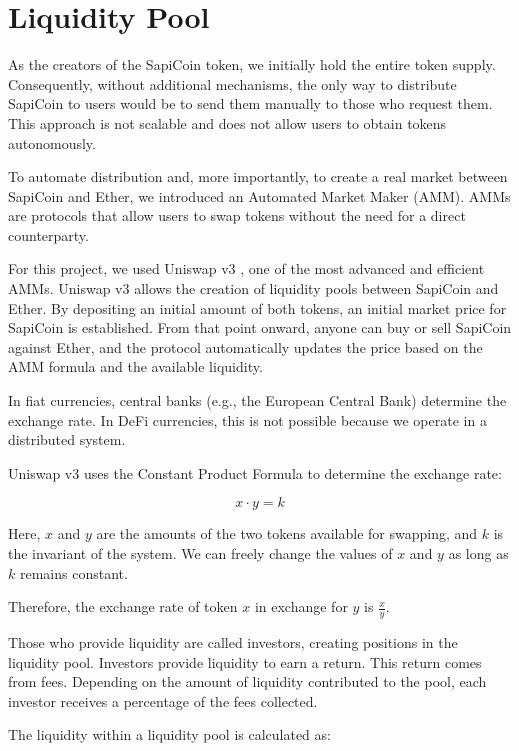 \documentclass[conference]{IEEEtran}
\begin{document}
\section{Liquidity Pool}

As the creators of the SapiCoin token, we initially hold the entire token supply. Consequently, without additional mechanisms, the only way to distribute SapiCoin to users would be to send them manually to those who request them. This approach is not scalable and does not allow users to obtain tokens autonomously.

To automate distribution and, more importantly, to create a real market between SapiCoin and Ether, we introduced an Automated Market Maker (AMM). AMMs are protocols that allow users to swap tokens without the need for a direct counterparty.

For this project, we used Uniswap v3 \cite{uniswapv3core2021} , one of the most advanced and efficient AMMs. Uniswap v3 allows the creation of liquidity pools between SapiCoin and Ether. By depositing an initial amount of both tokens, an initial market price for SapiCoin is established. From that point onward, anyone can buy or sell SapiCoin against Ether, and the protocol automatically updates the price based on the AMM formula and the available liquidity.

In fiat currencies, central banks (e.g., the European Central Bank) determine the exchange rate. In DeFi currencies, this is not possible because we operate in a distributed system.

Uniswap v3 uses the Constant Product Formula to determine the exchange rate:

\begin{equation}
x \cdot y = k
\end{equation}

Here, $x$ and $y$ are the amounts of the two tokens available for swapping, and $k$ is the invariant of the system. We can freely change the values of $x$ and $y$ as long as $k$ remains constant.

Therefore, the exchange rate of token $x$ in exchange for $y$ is $\frac{x}{y}$.

Those who provide liquidity are called investors, creating positions in the liquidity pool. Investors provide liquidity to earn a return. This return comes from fees. Depending on the amount of liquidity contributed to the pool, each investor receives a percentage of the fees collected.

The liquidity within a liquidity pool is calculated as:
\end{document}
